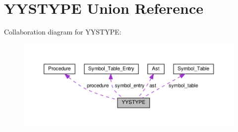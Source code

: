 \hypertarget{unionYYSTYPE}{}\section{Y\+Y\+S\+T\+Y\+PE Union Reference}
\label{unionYYSTYPE}


Collaboration diagram for Y\+Y\+S\+T\+Y\+PE\+:
\nopagebreak
\begin{figure}[H]
\begin{center}
\leavevmode
\includegraphics[width=350pt]{unionYYSTYPE__coll__graph}
\end{center}
\end{figure}
